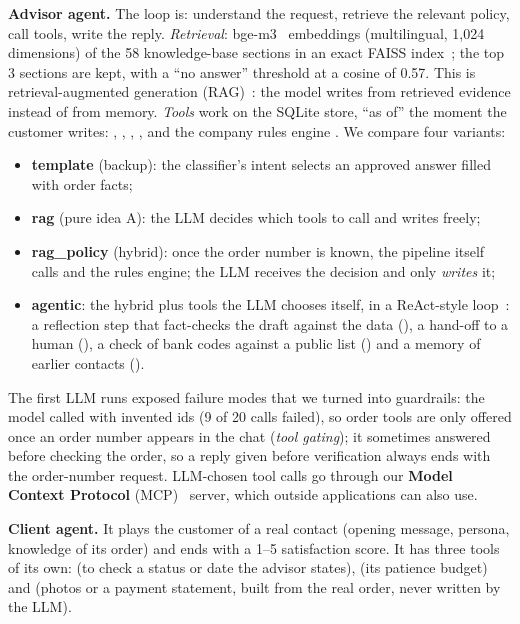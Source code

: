 \textbf{Advisor agent.} The loop is: understand the request, retrieve the relevant policy, call tools, write
the reply. \emph{Retrieval}: bge-m3~\cite{bgem3} embeddings (multilingual, 1,024 dimensions) of the 58
knowledge-base sections in an exact FAISS index~\cite{faiss}; the top 3 sections are kept, with a ``no answer''
threshold at a cosine of 0.57. This is retrieval-augmented generation (RAG)~\cite{rag}: the model writes from
retrieved evidence instead of from memory. \emph{Tools} work on the SQLite store, ``as of'' the moment the
customer writes: , , ,
,  and the company rules engine . We
compare four variants:
\begin{itemize}
  \item \textbf{template} (backup): the classifier's intent selects an approved answer filled with order facts;
  \item \textbf{rag} (pure idea A): the LLM decides which tools to call and writes freely;
  \item \textbf{rag\_policy} (hybrid): once the order number is known, the pipeline itself calls
         and the rules engine; the LLM receives the decision and only \emph{writes} it;
  \item \textbf{agentic}: the hybrid plus tools the LLM chooses itself, in a ReAct-style loop~\cite{react}: a
        reflection step that fact-checks the draft against the data (), a hand-off
        to a human (), a check of bank codes against a public list
        () and a memory of earlier contacts ().
\end{itemize}
The first LLM runs exposed failure modes that we turned into guardrails: the model called 
with invented ids (9 of 20 calls failed), so order tools are only offered once an order number appears in the
chat (\emph{tool gating}); it sometimes answered before checking the order, so a reply given before
verification always ends with the order-number request. LLM-chosen tool calls go through our
\textbf{Model Context Protocol} (MCP)~\cite{mcp} server, which outside applications can also use.

\textbf{Client agent.} It plays the customer of a real contact (opening message, persona, knowledge of its
order) and ends with a 1--5 satisfaction score. It has three tools of its own:  (to
check a status or date the advisor states),  (its patience budget) and
 (photos or a payment statement, built from the real order, never written by the LLM).

